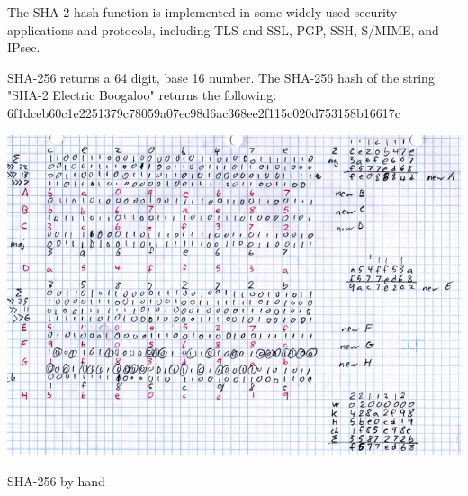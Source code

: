 \documentclass{tufte-handout}
\begin{document}
The SHA-2 hash function is implemented in some widely used security applications and protocols, including TLS and SSL, PGP, SSH, S/MIME, and IPsec.

SHA-256 returns a 64 digit, base 16 number.   The SHA-256 hash of the string "SHA-2 Electric Boogaloo" returns the following:\\
\vspace{0.5cm}
\noindent6f1dceb60c1e2251379c78059a07ec98d6ac368ee2f115c020d753158b16617c

\begin{marginfigure}[-110 pt]%
  \includegraphics[width=\linewidth]{sha.jpg}
  \caption{SHA-256 by hand}
  \label{fig:marginfig}
\end{marginfigure}
\end{document}
